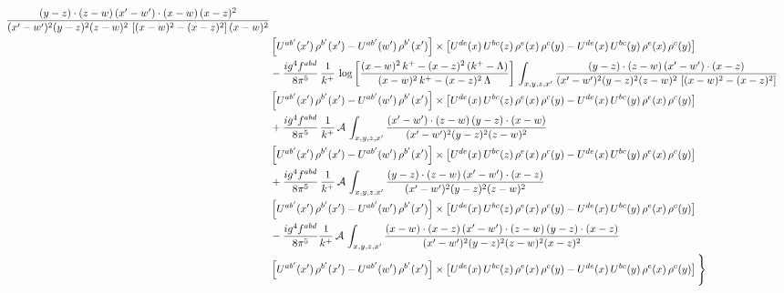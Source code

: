 \documentclass[9pt]{article}
\numberwithin{equation}{section}
\begin{document}
\begin{align}
\frac{(y-z)\cdot(z-w)\,(x'-w')\cdot(x-w)\,(x-z)^{2}}{(x'-w')^{2}(y-z)^{2}(z-w)^{2}\,\left[(x-w)^{2}-(x-z)^{2}\right](x-w)^{2}}\notag \\ 
& \left[U^{ab'}(x')\,\rho^{b'}(x')-U^{ab'}(w')\, \rho^{b'}(x')\right]\times \left[U^{de}(x)\,U^{bc}(z)\, \rho^{e}(x)\,\rho^{c}(y)-U^{de}(x)\,U^{bc}(y)\,\rho^{e}(x)\,\rho^{c}(y)\right]\notag \\ & -\frac{ig^{4}f^{abd}}{8\pi^{5}}\,\frac{1}{k^{+}}\,\log{\left[\frac{(x-w)^{2}\,k^{+}-(x-z)^{2}\,(k^{+}-\Lambda)}{(x-w)^{2}\,k^{+}-(x-z)^{2}\,\Lambda}\right]}\,\int_{x,y,z,x'}
\frac{(y-z)\cdot(z-w)\,(x'-w')\cdot(x-z)}{(x'-w')^{2}(y-z)^{2}(z-w)^{2}\,\left[(x-w)^{2}-(x-z)^{2}\right]}\notag \\ & \left[U^{ab'}(x')\,\rho^{b'}(x')-U^{ab'}(w')\, \rho^{b'}(x')\right]\times \left[U^{de}(x)\,U^{bc}(z)\, \rho^{e}(x)\,\rho^{c}(y)-U^{de}(x)\,U^{bc}(y)\,\rho^{e}(x)\,\rho^{c}(y)\right]\notag \\ & +\frac{ig^{4}f^{abd}}{8\pi^{5}}\,\frac{1}{k^{+}}\,\mathcal{A}\,\int_{x,y,z,x'}
\frac{(x'-w')\cdot(z-w)\,(y-z)\cdot(x-w)}{(x'-w')^{2}(y-z)^{2}(z-w)^{2}}\notag \\
& \left[U^{ab'}(x')\,\rho^{b'}(x')-U^{ab'}(w')\, \rho^{b'}(x')\right]\times \left[U^{de}(x)\,U^{bc}(z)\, \rho^{e}(x)\,\rho^{c}(y)-U^{de}(x)\,U^{bc}(y)\,\rho^{e}(x)\,\rho^{c}(y)\right]\notag \\ & +\frac{ig^{4}f^{abd}}{8\pi^{5}}\,\frac{1}{k^{+}}\,\mathcal{A}\,\int_{x,y,z,x'}
\frac{(y-z)\cdot(z-w)\,(x'-w')\cdot(x-z)}{(x'-w')^{2}(y-z)^{2}(z-w)^{2}}\notag \\ & \left[U^{ab'}(x')\,\rho^{b'}(x')-U^{ab'}(w')\, \rho^{b'}(x')\right]\times \left[U^{de}(x)\,U^{bc}(z)\, \rho^{e}(x)\,\rho^{c}(y)-U^{de}(x)\,U^{bc}(y)\,\rho^{e}(x)\,\rho^{c}(y)\right]\notag \\ & -\frac{ig^{4}f^{abd}}{8\pi^{5}}\frac{1}{k^{+}}\,\mathcal{A}\,\int_{x,y,z,x'}
\frac{(x-w)\cdot(x-z)\,(x'-w')\cdot(z-w)\,(y-z)\cdot(x-z)}{(x'-w')^{2}(y-z)^{2}(z-w)^{2}(x-z)^{2}}\notag \\ & \left[U^{ab'}(x')\,\rho^{b'}(x')-U^{ab'}(w')\, \rho^{b'}(x')\right]\times \left[U^{de}(x)\,U^{bc}(z)\, \rho^{e}(x)\,\rho^{c}(y)-U^{de}(x)\,U^{bc}(y)\,\rho^{e}(x)\,\rho^{c}(y)\right]\Bigg\}
\end{align}
\end{document}
